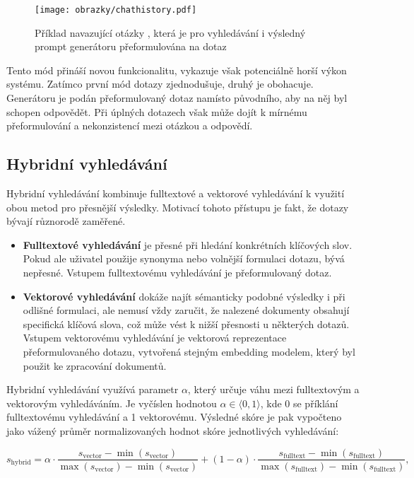 \begin{figure}[H]
    \centering
    \texttt{[image: obrazky/chathistory.pdf]}
    \caption{Příklad navazující otázky , která je pro vyhledávání i výsledný prompt generátoru přeformulována na dotaz }
    \label{fig:rewriting}
\end{figure}

Tento mód přináší novou funkcionalitu, vykazuje však potenciálně horší výkon systému. Zatímco první mód dotazy zjednodušuje, druhý je obohacuje. Generátoru je podán přeformulovaný dotaz namísto původního, aby na něj byl schopen odpovědět. Při úplných dotazech však může dojít k mírnému přeformulování a nekonzistencí mezi otázkou a odpovědí.

\subsection{Hybridní vyhledávání}
\label{hybrid}
Hybridní vyhledávání kombinuje fulltextové a vektorové vyhledávání k využití obou metod pro přesnější výsledky. Motivací tohoto přístupu je fakt, že dotazy bývají různorodě zaměřené. 
\begin{itemize}
    \item \textbf{Fulltextové vyhledávání} je přesné při hledání konkrétních klíčových slov. Pokud ale uživatel použije synonyma nebo volnější formulaci dotazu, bývá nepřesné. Vstupem fulltextovému vyhledávání je přeformulovaný dotaz.
    \item \textbf{Vektorové vyhledávání} dokáže najít sémanticky podobné výsledky i při odlišné formulaci, ale nemusí vždy zaručit, že nalezené dokumenty obsahují specifická klíčová slova, což může vést k nižší přesnosti u některých dotazů. Vstupem vektorovému vyhledávání je vektorová reprezentace přeformulovaného dotazu, vytvořená stejným embedding modelem, který byl použit ke zpracování dokumentů.
\end{itemize}
Hybridní vyhledávání využívá parametr $\alpha$, který určuje váhu mezi fulltextovým a vektorovým vyhledáváním. Je vyčíslen hodnotou $\alpha \in \langle 0, 1 \rangle$, kde 0 se příklání fulltextovému vyhledávání a 1 vektorovému. 
Výsledné skóre je pak vypočteno jako vážený průměr normalizovaných hodnot skóre jednotlivých vyhledávání:

\begin{equation}
    s_{\text{hybrid}} = \alpha \cdot \frac{s_{\text{vector}} - \min(s_{\text{vector}})}{\max(s_{\text{vector}}) - \min(s_{\text{vector}})} + (1 - \alpha) \cdot \frac{s_{\text{fulltext}} - \min(s_{\text{fulltext}})}{\max(s_{\text{fulltext}}) - \min(s_{\text{fulltext}})},
\end{equation}

